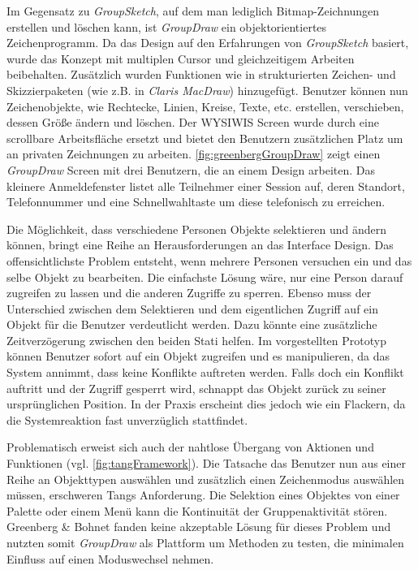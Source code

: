 \medskip Im Gegensatz zu \emph{GroupSketch}, auf dem man lediglich Bitmap-Zeichnungen erstellen und löschen kann, ist \emph{GroupDraw} ein objektorientiertes Zeichenprogramm. Da das Design auf den Erfahrungen von \emph{GroupSketch} basiert, wurde das Konzept mit multiplen Cursor und gleichzeitigem Arbeiten beibehalten. Zusätzlich wurden Funktionen wie in strukturierten Zeichen- und Skizzierpaketen (wie z.B. in \emph{Claris MacDraw}) hinzugefügt. Benutzer können nun Zeichenobjekte, wie Rechtecke, Linien, Kreise, Texte, etc. erstellen, verschieben, dessen Größe ändern und löschen. Der WYSIWIS Screen wurde durch eine scrollbare Arbeitsfläche ersetzt und bietet den Benutzern zusätzlichen Platz um an privaten Zeichnungen zu arbeiten. \autoref{fig:greenbergGroupDraw} zeigt einen \emph{GroupDraw} Screen mit drei Benutzern, die an einem Design arbeiten. Das kleinere Anmeldefenster listet alle Teilnehmer einer Session auf, deren Standort, Telefonnummer und eine Schnellwahltaste um diese telefonisch zu erreichen.

\medskip Die Möglichkeit, dass verschiedene Personen Objekte selektieren und ändern können, bringt eine Reihe an Herausforderungen an das Interface Design. Das offensichtlichste Problem entsteht, wenn mehrere Personen versuchen ein und das selbe Objekt zu bearbeiten. Die einfachste Lösung wäre, nur eine Person darauf zugreifen zu lassen und die anderen Zugriffe zu sperren. 
Ebenso muss der Unterschied zwischen dem Selektieren und dem eigentlichen Zugriff auf ein Objekt für die Benutzer verdeutlicht werden. Dazu könnte eine zusätzliche Zeitverzögerung zwischen den beiden Stati helfen. Im vorgestellten Prototyp können Benutzer sofort auf ein Objekt zugreifen und es manipulieren, da das System annimmt, dass keine Konflikte auftreten werden. Falls doch ein Konflikt auftritt und der Zugriff gesperrt wird, schnappt das Objekt zurück zu seiner ursprünglichen Position. In der Praxis erscheint dies jedoch wie ein Flackern, da die Systemreaktion fast unverzüglich stattfindet.

\medskip Problematisch erweist sich auch der nahtlose Übergang von Aktionen und Funktionen (vgl. \autoref{fig:tangFramework}). Die Tatsache das Benutzer nun aus einer Reihe an Objekttypen auswählen und zusätzlich einen Zeichenmodus auswählen müssen, erschweren Tangs Anforderung. Die Selektion eines Objektes von einer Palette oder einem Menü kann die Kontinuität der Gruppenaktivität stören. Greenberg \& Bohnet fanden keine akzeptable Lösung für dieses Problem und nutzten somit \emph{GroupDraw} als Plattform um Methoden zu testen, die minimalen Einfluss auf einen Moduswechsel nehmen.


